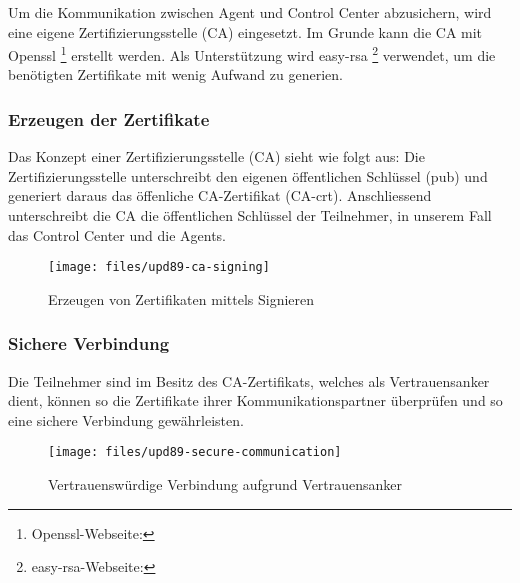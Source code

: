 Um die Kommunikation zwischen Agent und Control Center abzusichern, wird eine eigene Zertifizierungsstelle (CA) eingesetzt. Im Grunde kann die CA mit Openssl \footnote{Openssl-Webseite: } erstellt werden. Als Unterstützung wird easy-rsa \footnote{easy-rsa-Webseite: } verwendet, um die benötigten Zertifikate mit wenig Aufwand zu generien.


\subsubsection*{Erzeugen der Zertifikate}
Das Konzept einer Zertifizierungsstelle (CA) sieht wie folgt aus: Die Zertifizierungsstelle unterschreibt den eigenen öffentlichen Schlüssel (pub) und generiert daraus das öffenliche CA-Zertifikat (CA-crt). Anschliessend unterschreibt die CA die öffentlichen Schlüssel der Teilnehmer, in unserem Fall das Control Center und die Agents.

\begin{figure}
  \centering
    \texttt{[image: files/upd89-ca-signing]}
  \caption{Erzeugen von Zertifikaten mittels Signieren}
  \label{fig:sec-signin}
\end{figure}

\clearpage
\subsubsection*{Sichere Verbindung}

Die Teilnehmer sind im Besitz des CA-Zertifikats, welches als Vertrauensanker dient, können so die Zertifikate ihrer Kommunikationspartner überprüfen und so eine sichere Verbindung gewährleisten.


\begin{figure}
  \centering
    \texttt{[image: files/upd89-secure-communication]}
  \caption{Vertrauenswürdige Verbindung aufgrund Vertrauensanker}
  \label{fig:sec-connection}
\end{figure}
